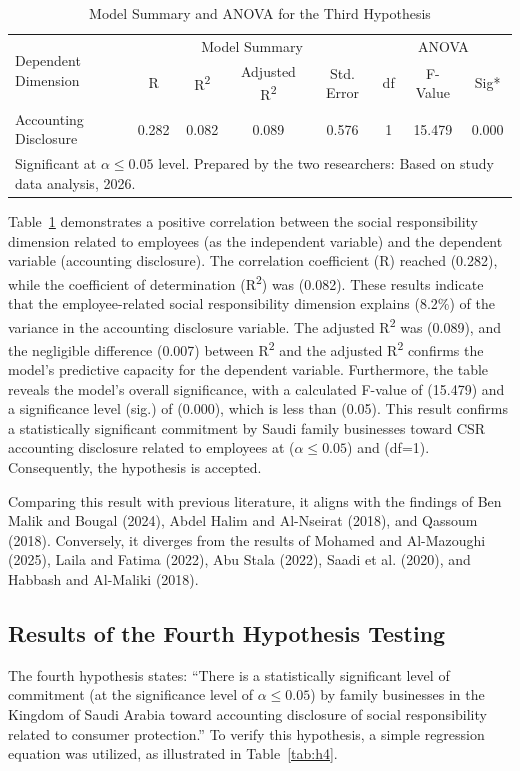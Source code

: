 \documentclass{NSP1}
\begin{document}
\begin{table}[!ht]
\centering
\caption{Model Summary and ANOVA for the Third Hypothesis}
\label{tab:h3}
\begin{tabular}{lccccccc}
\hline
\multirow{2}{*}{Dependent Dimension} & \multicolumn{4}{c}{Model Summary} & \multicolumn{3}{c}{ANOVA} \\
 & R & R\textsuperscript{2} & Adjusted R\textsuperscript{2} & Std. Error & df & F-Value & Sig* \\
\hline
Accounting Disclosure & 0.282 & 0.082 & 0.089 & 0.576 & 1 & 15.479 & 0.000 \\
\hline
\multicolumn{8}{l}{\footnotesize *Significant at $\alpha \le 0.05$ level. Prepared by the two researchers: Based on study data analysis, 2026.} \\
\end{tabular}
\end{table}

Table~\ref{tab:h3} demonstrates a positive correlation between the social responsibility dimension related to employees (as the independent variable) and the dependent variable (accounting disclosure). The correlation coefficient (R) reached (0.282), while the coefficient of determination (R\textsuperscript{2}) was (0.082). These results indicate that the employee-related social responsibility dimension explains (8.2\%) of the variance in the accounting disclosure variable. The adjusted R\textsuperscript{2} was (0.089), and the negligible difference (0.007) between R\textsuperscript{2} and the adjusted R\textsuperscript{2} confirms the model's predictive capacity for the dependent variable. Furthermore, the table reveals the model's overall significance, with a calculated F-value of (15.479) and a significance level (sig.) of (0.000), which is less than (0.05). This result confirms a statistically significant commitment by Saudi family businesses toward CSR accounting disclosure related to employees at ($\alpha \le 0.05$) and (df=1). Consequently, the hypothesis is accepted.

Comparing this result with previous literature, it aligns with the findings of Ben Malik and Bougal (2024), Abdel Halim and Al-Nseirat (2018), and Qassoum (2018). Conversely, it diverges from the results of Mohamed and Al-Mazoughi (2025), Laila and Fatima (2022), Abu Stala (2022), Saadi et al. (2020), and Habbash and Al-Maliki (2018).

\subsection{Results of the Fourth Hypothesis Testing}
The fourth hypothesis states: ``There is a statistically significant level of commitment (at the significance level of $\alpha \le 0.05$) by family businesses in the Kingdom of Saudi Arabia toward accounting disclosure of social responsibility related to consumer protection.'' To verify this hypothesis, a simple regression equation was utilized, as illustrated in Table~\ref{tab:h4}.
\end{document}
